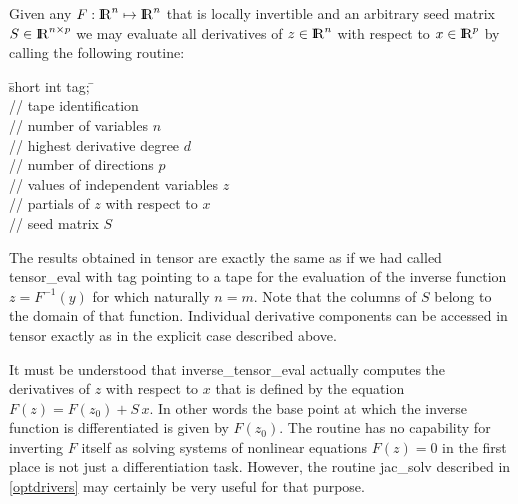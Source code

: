 \documentclass[11pt,twoside]{article}
\newcommand{\R}{{ {\rm I} \kern -.225em {\rm R} }}
\begin{document}
Given any $ F : \R^n \mapsto \R^n $ that is locally invertible and an arbitrary
seed matrix $S \in \R^{n \times p}$ we may evaluate all derivatives of $z \in \R^n$
with respect to $x \in \R^p$ by calling the following routine: 
%
\begin{tabbing}
\hspace{0.5in}\={\sf short int tag;} \hspace{1.1in}\= \kill    %
\\
         \> // tape identification \\
                 \> // number of variables $n$\\
                 \> // highest derivative degree $d$\\
                 \> // number of directions $p$\\
          \> // values of independent variables $z$\\
\> // partials of $z$ with respect to $x$\\
        \> // seed matrix $S$
\end{tabbing}                 
%                 
The results obtained in {\sf tensor} are exactly the same as if we had called {\sf tensor\_eval} with 
{\sf tag} pointing to a tape for the evaluation of the inverse function 
$z=F^{-1}(y)$ for which naturally $n=m$. Note that the columns of $S$ belong 
to the domain of that function. Individual derivative components can be 
accessed in tensor exactly as in the explicit case described above. 

It must be understood that {\sf inverse\_tensor\_eval} actually computes the
derivatives of $z$ with respect to $x$ that is defined by the equation
$F(z)=F(z_0)+S \, x$. In other words the base point at
which the inverse function is differentiated is given by $F(z_0)$.
The routine has no capability for inverting $F$ itself as
solving systems of nonlinear
equations $F(z)=0$ in the first place is not just a differentiation task.
However, the routine {\sf jac\_solv} described in \autoref{optdrivers} may certainly be very
useful for that purpose. 
\end{document}

